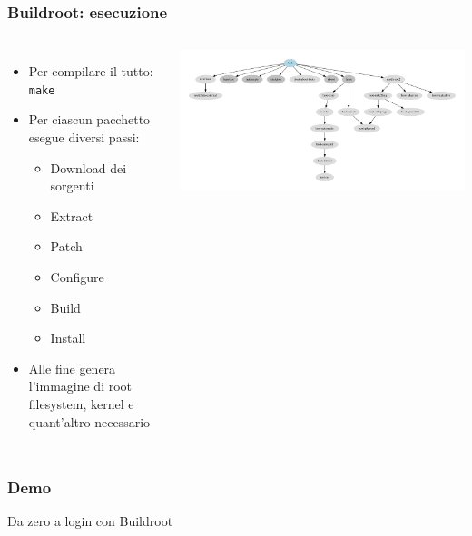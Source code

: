 \documentclass[xetex,table]{beamer}
\begin{document}
\begin{frame}
  \frametitle{Buildroot: esecuzione}
  \begin{columns}
    \begin{itemize}
    \item Per compilare il tutto:\\
      \texttt{make}
    \item Per ciascun pacchetto esegue diversi passi:
      \begin{itemize}
      \item Download dei sorgenti
      \item Extract
      \item Patch
      \item Configure
      \item Build
      \item Install
      \end{itemize}
    \item Alle fine genera l'immagine di root filesystem, kernel e
      quant'altro necessario
    \end{itemize}
    \includegraphics[width=\textwidth]{images/graph-depends.pdf}
  \end{columns}
\end{frame}

\begin{frame}
\frametitle[Demo! Da zero a login con Buildroot]{Demo}
  \begin{center}
    \LARGE
    Da zero a login con Buildroot
  \end{center}
\end{frame}
\end{document}
